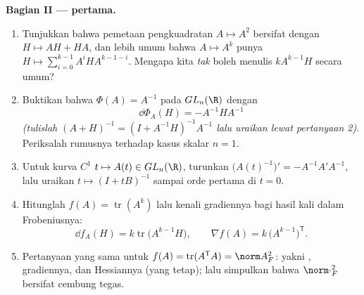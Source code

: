 \begin{problem}
\medskip
\noindent\textbf{Bagian II ---  pertama.}
\begin{enumerate}[resume]
  \item Tunjukkan bahwa pemetaan pengkuadratan $A \mapsto A^2$ bersifat
         dengan  $H \mapsto AH + HA$,
        dan lebih umum bahwa $A \mapsto A^k$ punya
         $H \mapsto \sum_{i=0}^{k-1}
        A^iHA^{k-1-i}$. Mengapa kita \emph{tak} boleh menulis $kA^{k-1}H$
        secara umum?
  \item Buktikan bahwa $\Phi(A) = A^{-1}$  pada
        $GL_n(\R)$ dengan
        \[
        \dd\Phi_A(H) = -A^{-1}HA^{-1}
        \]
        \emph{(tulislah $(A + H)^{-1} = (I + A^{-1}H)^{-1}A^{-1}$
        lalu uraikan lewat pertanyaan 2)}. Periksalah rumusnya terhadap
        kasus skalar $n = 1$.
  \item Untuk kurva $C^1$ $t \mapsto A(t) \in GL_n(\R)$, turunkan
        $\bigl(A(t)^{-1}\bigr)' = -A^{-1}A'A^{-1}$, lalu uraikan
        $t \mapsto (I + tB)^{-1}$ sampai orde pertama di $t = 0$.
  \item Hitunglah  $f(A) =
        \operatorname{tr}(A^k)$ lalu kenali gradiennya bagi
        hasil kali dalam Frobeniusnya:
        \[
        \dd f_A(H) = k\operatorname{tr}\bigl(A^{k-1}H\bigr),
        \qquad
        \nabla f(A) = k\,\bigl(A^{k-1}\bigr)^{\mathsf T} .
        \]
  \item Pertanyaan yang sama untuk $f(A) = \operatorname{tr}
        (A^{\mathsf T}A) = \norm A_F^2$: yakni ,
        gradiennya, dan Hessiannya (yang tetap); lalu simpulkan bahwa
        $\norm\cdot_F^2$ bersifat cembung tegas.
\end{enumerate}


\end{problem}
